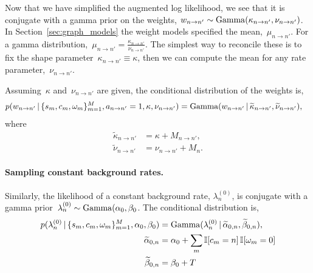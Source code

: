 Now that we have simplified the augmented log likelihood, we see that
it is conjugate with a gamma prior on the weights, ${w_{n \to n'} \sim
  \mathrm{Gamma}(\kappa_{n \to n'}, \nu_{n \to n'}})$.  In
Section~\ref{sec:graph_models} the weight models specified the
mean,~$\mu_{n \to n'}$.  For a gamma distribution,~${\mu_{n \to n'} =
  \frac{\kappa_{n \to n'}}{\nu_{n \to n'}}}$. The simplest way to
reconcile these is to fix the shape parameter~${\kappa_{n \to n'}
  \equiv \kappa}$, then we can compute the mean for any rate
parameter,~$\nu_{n \to n'}$.

Assuming~$\kappa$ and~$\nu_{n \to n'}$ are given,
the conditional distribution of the weights is,
\begin{align*}
  p(w_{n \to n'}\,|\, \{s_m,c_m,\omega_m\}_{m=1}^M, a_{n\to n'}=1, \kappa, \nu_{n \to n'})
  &= 
  \mathrm{Gamma}(w_{n \to n'} \,|\, \widetilde{\kappa}_{n \to n'}, \widetilde{\nu}_{n \to n'}),
\end{align*}
where
\begin{align*}
  \widetilde{\kappa}_{n \to n'} &= \kappa + M_{n \to n'}, \\
  \widetilde{\nu}_{n \to n'} &= \nu_{n \to n'} + M_n.
\end{align*}


\paragraph{Sampling constant background rates.}
Similarly, the likelihood of a constant background rate,
${\lambda^{(0)}_{n}}$, is conjugate with a gamma
prior~${\lambda^{(0)}_{n} \sim
  \mathrm{Gamma}(\alpha_0,\beta_0}$.  The conditional
distribution is,
\begin{align*}
  p(\lambda^{(0)}_{n} \,|\, \{s_m,c_m, \omega_m\}_{m=1}^M, \alpha_0, \beta_0)
  &=
  \mathrm{Gamma}(\lambda^{(0)}_{n} \,|\, \widetilde{\alpha}_{0,n},  \widetilde{\beta}_{0,n}),\\
  \widetilde{\alpha}_{0,n} &= \alpha_0 + \sum_m \mathbb{I}[c_m = n] \, \mathbb{I}[\omega_m=0] \\
  \widetilde{\beta}_{0,n} &= \beta_0 + T
\end{align*}


